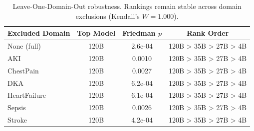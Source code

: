 \begin{table}[t]
\centering
\caption{Leave-One-Domain-Out robustness. Rankings remain stable across domain exclusions (Kendall's $W = 1.000$).}
\label{tab:lodo}
\small
\begin{tabular}{lccc}
\toprule
\textbf{Excluded Domain} & \textbf{Top Model} & \textbf{Friedman $p$} & \textbf{Rank Order} \\
\midrule
None (full) & 120B & 2.6e-04 & 120B > 35B > 27B > 4B \\
AKI & 120B & 0.0010 & 120B > 35B > 27B > 4B \\
ChestPain & 120B & 0.0027 & 120B > 35B > 27B > 4B \\
DKA & 120B & 6.2e-04 & 120B > 35B > 27B > 4B \\
HeartFailure & 120B & 6.1e-04 & 120B > 35B > 27B > 4B \\
Sepsis & 120B & 0.0026 & 120B > 35B > 27B > 4B \\
Stroke & 120B & 4.2e-04 & 120B > 35B > 27B > 4B \\
\bottomrule
\end{tabular}
\end{table}
